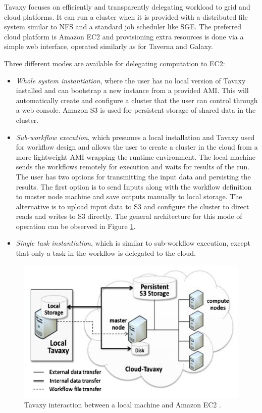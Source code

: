 \documentclass[11pt,a4paper]{report}
\begin{document}
Tavaxy focuses on efficiently and transparently delegating workload to grid and cloud platforms. It can run a cluster when it is provided with a distributed file system similar to NFS and a standard job scheduler like SGE. The preferred cloud platform is Amazon EC2 and provisioning extra resources is done via a simple web interface, operated similarly as for Taverna and Galaxy.

Three different modes are available for delegating computation to EC2:

\begin{itemize}
	\item \textit{Whole system instantiation}, where the user has no local version of Tavaxy installed and can bootstrap a new instance from a provided AMI. This will automatically create and configure a cluster that the user can control through a web console. Amazon S3 \cite{S3} is used for persistent storage of shared data in the cluster.
	\item \textit{Sub-workflow execution}, which presumes a local installation and Tavaxy used for workflow design and allows the user to create a cluster in the cloud from a more lightweight AMI wrapping the runtime environment. The local machine sends the workflows remotely for execution and waits for results of the run. The user has two options for transmitting the input data and persisting the results. The first option is to send Inputs along with the workflow definition to master node machine and save outputs manually to local storage. The alternative is to upload input data to S3 and configure the cluster to direct reads and writes to S3 directly. The general architecture for this mode of operation can be observed in Figure \ref{TavaxyArch}.
	\item \textit{Single task instantiation}, which is similar to sub-workflow execution, except that only a task in the workflow is delegated to the cloud.
\end{itemize}

\vspace{5mm}
\begin{figure}[h]
	\centering
		\includegraphics[scale=0.25]{figures/TavaxyArch.png}
	\caption{Tavaxy interaction between a local machine and Amazon EC2 \cite{Abouelhoda2012}.}
	\label{TavaxyArch}
\end{figure}
\end{document}
